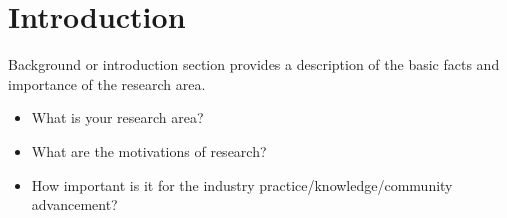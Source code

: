 \section*{Introduction}
\label{sec:introduction}

Background or introduction section provides a description of the basic facts 
and importance of the research area. 
\begin{itemize}
	\item What is your research area?
	\item What are the motivations of research? 
	\item How important is it for the industry practice/knowledge/community 
	advancement?
\end{itemize}
